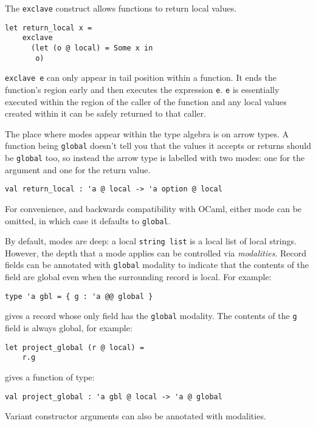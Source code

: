 \documentclass[acmsmall, screen, review, anonymous]{acmart}
\theoremstyle{definition}
\begin{document}
The \lstinline[style=oxcaml]{exclave} construct allows functions to
return local values.
\begin{lstlisting}[style=oxcaml]
  let return_local x =
    exclave
      (let (o @ local) = Some x in
       o)
\end{lstlisting}
\lstinline[style=oxcaml]{exclave e} can only appear in tail position
within a function.  It ends the function's region early and then
executes the expression
\lstinline[style=oxcaml]{e}. \lstinline[style=oxcaml]{e} is essentially
executed within the region of the caller of the function and any local
values created within it can be safely returned to that caller.

The place where modes appear within the type algebra is on arrow
types. A function being \lstinline[style=oxcaml]{global} doesn't tell you
that the values it accepts or returns should be
\lstinline[style=oxcaml]{global} too, so instead the arrow type is
labelled with two modes: one for the argument and one for the return
value.
\begin{lstlisting}[style=oxcaml]
  val return_local : 'a @ local -> 'a option @ local
\end{lstlisting}
For convenience, and backwards compatibility with OCaml, either mode can
be omitted, in which case it defaults to
\lstinline[style=oxcaml]{global}.

By default, modes are deep: a local \lstinline[style=oxcaml]{string list}
is a local list of local strings. However, the depth that a mode applies
can be controlled via \emph{modalities}. Record fields can be annotated
with \lstinline[style=oxcaml]{global} modality to indicate that the
contents of the field are global even when the surrounding record is
local. For example:
\begin{lstlisting}[style=oxcaml]
  type 'a gbl = { g : 'a @@ global }
\end{lstlisting}
gives a record whose only field has the \lstinline[style=oxcaml]{global}
modality. The contents of the \lstinline[style=oxcaml]{g} field is always
global, for example:
\begin{lstlisting}[style=oxcaml]
  let project_global (r @ local) =
    r.g
\end{lstlisting}
gives a function of type:
\begin{lstlisting}[style=oxcaml]
  val project_global : 'a gbl @ local -> 'a @ global
\end{lstlisting}
Variant constructor arguments can also be annotated with modalities.
\end{document}
